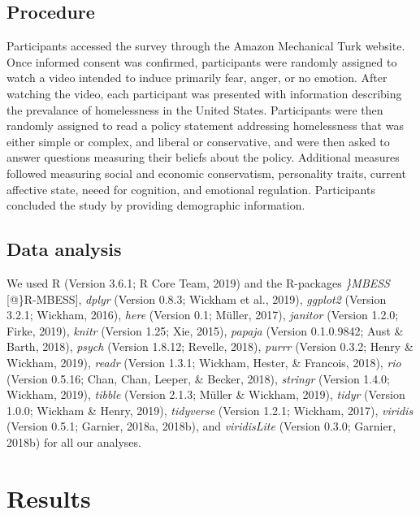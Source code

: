 \documentclass[man]{apa6}
\begin{document}
\hypertarget{procedure}{%
\subsection{Procedure}\label{procedure}}

Participants accessed the survey through the Amazon Mechanical Turk website. Once informed consent was confirmed, participants were randomly assigned to watch a video intended to induce primarily fear, anger, or no emotion. After watching the video, each participant was presented with information describing the prevalance of homelessness in the United States. Participants were then randomly assigned to read a policy statement addressing homelessness that was either simple or complex, and liberal or conservative, and were then asked to answer questions measuring their beliefs about the policy. Additional measures followed measuring social and economic conservatism, personality traits, current affective state, neeed for cognition, and emotional regulation. Participants concluded the study by providing demographic information.

\hypertarget{data-analysis}{%
\subsection{Data analysis}\label{data-analysis}}

We used R (Version 3.6.1; R Core Team, 2019) and the R-packages \emph{\}MBESS} {[}@\}R-MBESS{]}, \emph{dplyr} (Version 0.8.3; Wickham et al., 2019), \emph{ggplot2} (Version 3.2.1; Wickham, 2016), \emph{here} (Version 0.1; Müller, 2017), \emph{janitor} (Version 1.2.0; Firke, 2019), \emph{knitr} (Version 1.25; Xie, 2015), \emph{papaja} (Version 0.1.0.9842; Aust \& Barth, 2018), \emph{psych} (Version 1.8.12; Revelle, 2018), \emph{purrr} (Version 0.3.2; Henry \& Wickham, 2019), \emph{readr} (Version 1.3.1; Wickham, Hester, \& Francois, 2018), \emph{rio} (Version 0.5.16; Chan, Chan, Leeper, \& Becker, 2018), \emph{stringr} (Version 1.4.0; Wickham, 2019), \emph{tibble} (Version 2.1.3; Müller \& Wickham, 2019), \emph{tidyr} (Version 1.0.0; Wickham \& Henry, 2019), \emph{tidyverse} (Version 1.2.1; Wickham, 2017), \emph{viridis} (Version 0.5.1; Garnier, 2018a, 2018b), and \emph{viridisLite} (Version 0.3.0; Garnier, 2018b) for all our analyses.

\hypertarget{results}{%
\section{Results}\label{results}}
\end{document}
